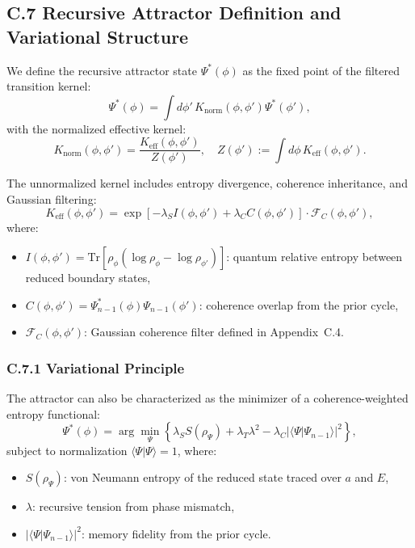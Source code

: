 \subsection*{C.7 Recursive Attractor Definition and Variational Structure}
\label{appendix:C7}

We define the recursive attractor state \( \Psi^*(\phi) \) as the fixed point of the filtered transition kernel:
\begin{equation}
\Psi^*(\phi) = \int d\phi' \, K_{\text{norm}}(\phi, \phi') \Psi^*(\phi'),
\end{equation}
with the normalized effective kernel:
\begin{equation}
K_{\text{norm}}(\phi, \phi') = \frac{K_{\text{eff}}(\phi, \phi')}{Z(\phi')}, \quad Z(\phi') := \int d\phi \, K_{\text{eff}}(\phi, \phi').
\end{equation}

The unnormalized kernel includes entropy divergence, coherence inheritance, and Gaussian filtering:
\begin{equation}
K_{\text{eff}}(\phi, \phi') = \exp\left[-\lambda_S I(\phi, \phi') + \lambda_C C(\phi, \phi') \right] \cdot \mathcal{F}_C(\phi, \phi'),
\end{equation}
where:
\begin{itemize}
  \item \( I(\phi, \phi') = \mathrm{Tr}[\rho_\phi (\log \rho_\phi - \log \rho_{\phi'})] \): quantum relative entropy between reduced boundary states,
  \item \( C(\phi, \phi') = \Psi_{n-1}^*(\phi) \Psi_{n-1}(\phi') \): coherence overlap from the prior cycle,
  \item \( \mathcal{F}_C(\phi, \phi') \): Gaussian coherence filter defined in Appendix~C.4.
\end{itemize}

\subsubsection*{C.7.1 Variational Principle}

The attractor can also be characterized as the minimizer of a coherence-weighted entropy functional:
\begin{equation}
\Psi^*(\phi) = \arg\min_{\Psi} \left\{ \lambda_S S(\rho_\Psi) + \lambda_T \lambda^2 - \lambda_C |\langle \Psi | \Psi_{n-1} \rangle|^2 \right\},
\end{equation}
subject to normalization \( \langle \Psi | \Psi \rangle = 1 \), where:
\begin{itemize}
  \item \( S(\rho_\Psi) \): von Neumann entropy of the reduced state traced over \( a \) and \( E \),
  \item \( \lambda \): recursive tension from phase mismatch,
  \item \( |\langle \Psi | \Psi_{n-1} \rangle|^2 \): memory fidelity from the prior cycle.
\end{itemize}

